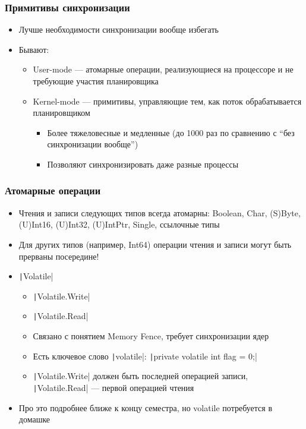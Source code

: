 \documentclass[xetex,mathserif,serif]{beamer}
\begin{document}
	\begin{frame}
		\frametitle{Примитивы синхронизации}
		\begin{itemize}
			\item Лучше необходимости синхронизации вообще избегать
			\item Бывают:
			\begin{itemize}
				\item User-mode --- атомарные операции, реализующиеся на процессоре и не требующие участия планировщика
				\item Kernel-mode --- примитивы, управляющие тем, как поток обрабатывается планировщиком
				\begin{itemize}
					\item Более тяжеловесные и медленные (до 1000 раз по сравнению с ``без синхронизации вообще'')
					\item Позволяют синхронизировать даже разные процессы
				\end{itemize}
			\end{itemize}
		\end{itemize}
	\end{frame}

	\begin{frame}
		\frametitle{Атомарные операции}
		\begin{itemize}
			\item Чтения и записи следующих типов всегда атомарны: Boolean, Char, (S)Byte, (U)Int16, (U)Int32, (U)IntPtr, Single, ссылочные типы
			\item Для других типов (например, Int64) операции чтения и записи могут быть прерваны посередине!
			\item \texttt|Volatile|
			\begin{itemize}
				\item \texttt|Volatile.Write|
				\item \texttt|Volatile.Read|
				\item Связано с понятием Memory Fence, требует синхронизации ядер
				\item Есть ключевое слово \texttt|volatile|: \texttt|private volatile int flag = 0;|
				\item \texttt|Volatile.Write| должен быть последней операцией записи, \texttt|Volatile.Read| --- первой операцией чтения
			\end{itemize}
			\item Про это подробнее ближе к концу семестра, но volatile потребуется в домашке
		\end{itemize}
	\end{frame}
\end{document}
